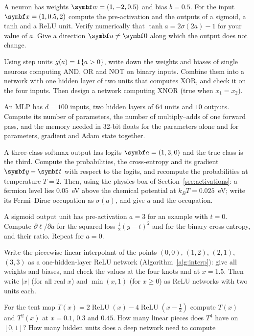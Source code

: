 \documentclass[11pt]{article}
\newcommand{\w}{\vect{w}}
\newcommand{\y}{\vect{y}}
\newcommand{\vt}{\vect{t}}
\newcommand{\va}{\vect{a}}
\newcommand{\relu}{\operatorname{ReLU}}
\begin{document}
\begin{questions}
\begin{calculations}
\item A neuron has weights $\w = (1, -2, 0.5)$ and bias $b = 0.5$. For the input $\x = (1, 0.5, 2)$ compute the
  pre-activation and the outputs of a sigmoid, a tanh and a ReLU unit. Verify numerically that $\tanh a = 2\sigma(2a) - 1$
  for your value of $a$. Give a direction $\vect{u} \ne \vect{0}$ along which the output does not change.
\item Using step units $g(a) = \mathbf{1}\!\left\{a > 0\right\}$, write down the weights and biases of single neurons computing AND, OR and
  NOT on binary inputs. Combine them into a network with one hidden layer of two units that computes XOR, and check it
  on the four inputs. Then design a network computing XNOR (true when $x_1 = x_2$).
\item An MLP has $d = 100$ inputs, two hidden layers of $64$ units and $10$ outputs. Compute its number of parameters,
  the number of multiply--adds of one forward pass, and the memory needed in 32-bit floats for the parameters alone and
  for parameters, gradient and Adam state together.
\item A three-class softmax output has logits $\va = (1, 3, 0)$ and the true class is the third. Compute the
  probabilities, the cross-entropy and its gradient $\y - \vt$ with respect to the logits, and recompute the
  probabilities at temperature $T = 2$. Then, using the physics box of Section~\ref{sec:activations}: a fermion level lies
  $0.05$~eV above the chemical potential at $k_BT = 0.025$~eV; write its Fermi--Dirac occupation as $\sigma(a)$, and give
  $a$ and the occupation.
\item A sigmoid output unit has pre-activation $a = 3$ for an example with $t = 0$. Compute $\partial \ell/\partial a$ for
  the squared loss $\frac12(y - t)^2$ and for the binary cross-entropy, and their ratio. Repeat for $a = 0$.
\item Write the piecewise-linear interpolant of the points $(0, 0)$, $(1, 2)$, $(2, 1)$, $(3, 3)$ as a one-hidden-layer
  ReLU network (Algorithm~\ref{alg:interp}): give all weights and biases, and check the values at the four knots and at
  $x = 1.5$. Then write $|x|$ (for all real $x$) and $\min(x, 1)$ (for $x \ge 0$) as ReLU networks with two units each.
\item For the tent map $T(x) = 2\relu(x) - 4\relu(x - \frac12)$ compute $T(x)$ and $T^2(x)$ at $x = 0.1$, $0.3$ and
  $0.45$. How many linear pieces does $T^4$ have on $[0, 1]$? How many hidden units does a deep network need to compute

\end{calculations}
\end{questions}
\end{document}
